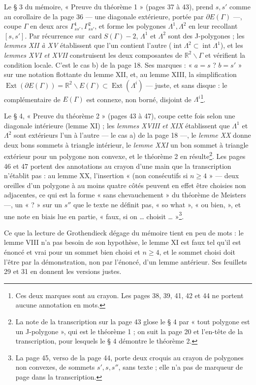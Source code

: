 \documentclass[11pt,a4paper]{article}
\begin{document}
Le § 3 du mémoire, « Preuve du théorème 1 » (pages 37 à 43), prend $s, s'$
comme au corollaire de la page 36 — une diagonale extérieure, portée par
$\partial E(\Gamma)$ —, coupe $\Gamma$ en deux arcs $\Gamma^1_{ss'},
\Gamma^2_{ss'}$, et forme les polygones $\Lambda^1, \Lambda^2$ en leur
recollant $[s, s']$. Par récurrence sur $\operatorname{card} S(\Gamma) - 2$,
$\Lambda^1$ et $\Lambda^2$ sont des J-polygones ; les \emph{lemmes XII à XV}
établissent que l'un contient l'autre ($\operatorname{int}\Lambda^2 \subset
\operatorname{int}\Lambda^1$), et les \emph{lemmes XVI et XVII} construisent
les deux composantes de $\mathbb{R}^2 \smallsetminus \Gamma$ et vérifient la
condition locale. C'est le cas b) de la page 18. Ses marques : « $a = s$ ? $b =
s'$ » sur une notation flottante du lemme XII, et, au lemme XIII, la
simplification $\operatorname{Ext}(\partial E(\Gamma)) = \mathbb{R}^2
\smallsetminus E(\Gamma) \subset \operatorname{Ext}(\Lambda^i)$ — juste, et
sans disque : le complémentaire de $E(\Gamma)$ est connexe, non borné, disjoint
de $\Lambda^i$\footnote{Ces deux marques sont au crayon. Les pages 38, 39, 41,
42 et 44 ne portent aucune annotation en mots.}.

Le § 4, « Preuve du théorème 2 » (pages 43 à 47), coupe cette fois selon une
diagonale intérieure (lemme XI) ; les \emph{lemmes XVIII et XIX} établissent
que $\Lambda^1$ et $\Lambda^2$ sont extérieurs l'un à l'autre — le cas a) de la
page 18 —, le \emph{lemme XX} donne deux bons sommets à triangle intérieur, le
\emph{lemme XXI} un bon sommet à triangle extérieur pour un polygone non
convexe, et le théorème 2 en résulte\footnote{La note de la transcription sur
la page 43 glose le § 4 par « tout polygone est un J-polygone », qui est le
théorème 1 ; on suit la page 20 et l'en-tête de la transcription, pour lesquels
le § 4 démontre le théorème 2.}. Les pages 46 et 47 portent des annotations au
crayon d'une main que la transcription n'établit pas : au lemme XX,
l'insertion « (non consécutifs si $n \geq 4$ » — deux oreilles d'un polygone
à au moins quatre côtés peuvent en effet être choisies non adjacentes, ce qui
est la forme « sans chevauchement » du théorème de Meisters —, un « ? » sur un
$s''$ que le texte ne définit pas, « so what », « ou bien, », et une note en
biais lue en partie, « faux, si on … choisit … »\footnote{La page 45, verso de
la page 44, porte deux croquis au crayon de polygones non convexes, de sommets
$s', s, s''$, sans texte ; elle n'a pas de marqueur de page dans la
transcription.}.

Ce que la lecture de Grothendieck dégage du mémoire tient en peu de mots :
le lemme VIII n'a pas besoin de son hypothèse, le lemme XI est faux tel qu'il
est énoncé et vrai pour un sommet bien choisi et $n \geq 4$, et le sommet
choisi doit l'être par la démonstration, non par l'énoncé, d'un lemme
antérieur. Ses feuillets 29 et 31 en donnent les versions justes.
\end{document}
